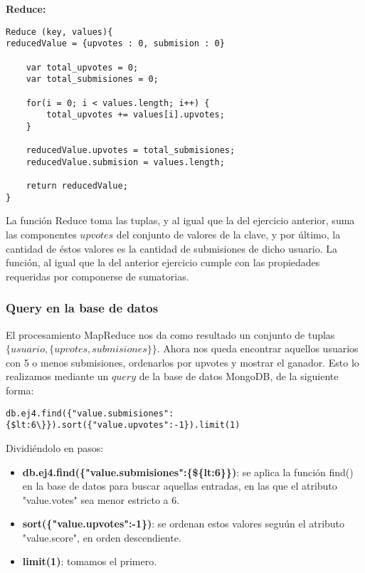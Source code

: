 \vspace{2mm}

\textbf{Reduce:}

\begin{lstlisting}
Reduce (key, values){
reducedValue = {upvotes : 0, submision : 0}
	
	var total_upvotes = 0;
	var total_submisiones = 0;

	for(i = 0; i < values.length; i++) {
		total_upvotes += values[i].upvotes;
	}

	reducedValue.upvotes = total_submisiones;
	reducedValue.submision = values.length;

    return reducedValue;
}
\end{lstlisting}

\vspace{2mm}

La funci\'on Reduce toma las tuplas, y al igual que la del ejercicio anterior, suma las componentes $upvotes$ del conjunto de valores de la clave, y por \'ultimo, la cantidad de \'estos valores es la cantidad de submisiones de dicho usuario. La funci\'on, al igual que la del anterior ejercicio cumple con las propiedades requeridas por componerse de sumatorias.

\subsubsection{Query en la base de datos}

El procesamiento MapReduce nos da como resultado un conjunto de tuplas $\{usuario, \{ upvotes, submisiones \}\}$. Ahora nos queda encontrar aquellos usuarios con 5 o menos submisiones, ordenarlos por upvotes y mostrar el ganador. Esto lo realizamos mediante un $query$ de la base de datos MongoDB, de la siguiente forma:

\vspace{2mm}

\begin{lstlisting}
db.ej4.find({"value.submisiones":{$lt:6\}}).sort({"value.upvotes":-1}).limit(1)
\end{lstlisting}

Dividi\'endolo en pasos:

\begin{itemize}

\item \textbf{db.ej4.find(\{"value.submisiones":\{\$\{lt:6\}\})}: se aplica la funci\'on find() en la base de datos para buscar aquellas entradas, en las que el atributo "value.votes" sea menor estricto a 6.

\item \textbf{sort(\{"value.upvotes":-1\})}: se ordenan estos valores segu\'un el atributo "value.score", en orden descendiente.

\item \textbf{limit(1)}: tomamos el primero.

\end{itemize}

